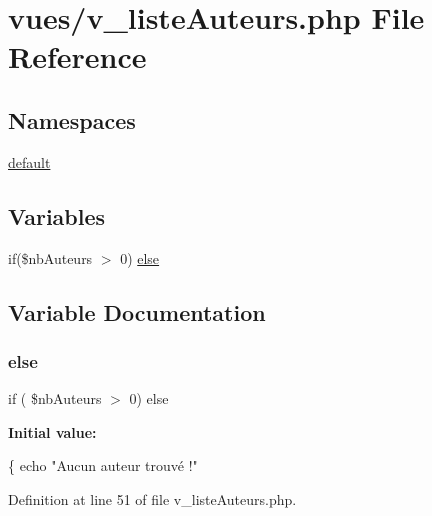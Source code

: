 \hypertarget{v__liste_auteurs_8php}{}\section{vues/v\+\_\+liste\+Auteurs.php File Reference}
\label{v__liste_auteurs_8php}
\subsection*{Namespaces}
\begin{DoxyCompactItemize}
\item 
 \hyperlink{namespacedefault}{default}
\end{DoxyCompactItemize}
\subsection*{Variables}
\begin{DoxyCompactItemize}
\item 
if(\$nb\+Auteurs $>$ 0) \hyperlink{v__liste_auteurs_8php_a66fb1b446e89ab14e0d6b783b3d82f09}{else}
\end{DoxyCompactItemize}


\subsection{Variable Documentation}
\mbox{\label{v__liste_auteurs_8php_a66fb1b446e89ab14e0d6b783b3d82f09}} 
\subsubsection{\texorpdfstring{else}{else}}
{\footnotesize\ttfamily if ( \$nb\+Auteurs $>$ 0) else}

{\bfseries Initial value\+:}
\begin{DoxyCode}
\{           
                    echo \textcolor{stringliteral}{"Aucun auteur trouvé !"}
\end{DoxyCode}


Definition at line 51 of file v\+\_\+liste\+Auteurs.\+php.

